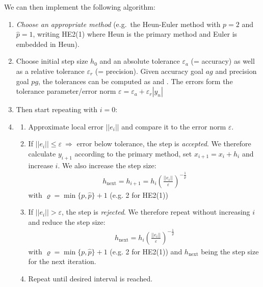 We can then implement the following algorithm:
\begin{enumerate}
    \item{
        \emph{Choose an appropriate method}
        (e.g.\ the Heun-Euler method with $p=2$ and $\hat{p}=1$, writing HE2(1)
        where Heun is the primary method and Euler is embedded in Heun).
    }
    \item{
        Choose initial step size $h_0$ and an absolute tolerance $\varepsilon_{a}$ (= accuracy) as
        well as a relative tolerance $\varepsilon_{r}$ (= precision).
        Given accuracy goal $ag$ and precision goal $pg$,
        the tolerances can be computed as 
        and .
        The errors form the tolerance parameter/error norm
        \colorbox{shadecolor}{
            $\displaystyle\varepsilon = \varepsilon_a + \varepsilon_r |y_n|$
        }
    }
    \item Then start repeating with $i=0$:
    \item{
        \begin{enumerate}
            \item{
                Approximate local error $||e_i||$ and compare it to the error norm $\varepsilon$.
            }
            \item{
                If $||e_i||\leq\varepsilon\ \Rightarrow$ error below tolerance,
                the step is \emph{\color{darkgreen}accepted}.
                We therefore calculate $y_{i+1}$ according to the primary method,
                set $x_{i+1} = x_i + h_i$ and increase $i$.
                We also increase the step size:
                \begin{align*}
                    h_\text{next} = h_{i+1} = h_i\left(\frac{||e_i||}{\varepsilon}\right)^{-\frac{1}{\varrho}}
                \end{align*}
                with $\varrho = \min\{p, \hat{p}\} + 1$ (e.g. 2 for HE2(1))
            }
            \item{
                If $||e_i||>\varepsilon$, the step is \emph{\color{red}rejected}.
                We therefore repeat without increasing $i$ and reduce the step size:
                \begin{align*}
                    h_\text{next} = h_i\left(\frac{||e_i||}{\varepsilon}\right)^{-\frac{1}{\varrho}}
                \end{align*}
                with $\varrho = \min\{p, \hat{p}\} + 1$ (e.g. 2 for HE2(1))
                and $h_\text{next}$ being the step size for the next iteration.
            }
            \item Repeat until desired interval is reached.
        \end{enumerate}
    }
\end{enumerate}

